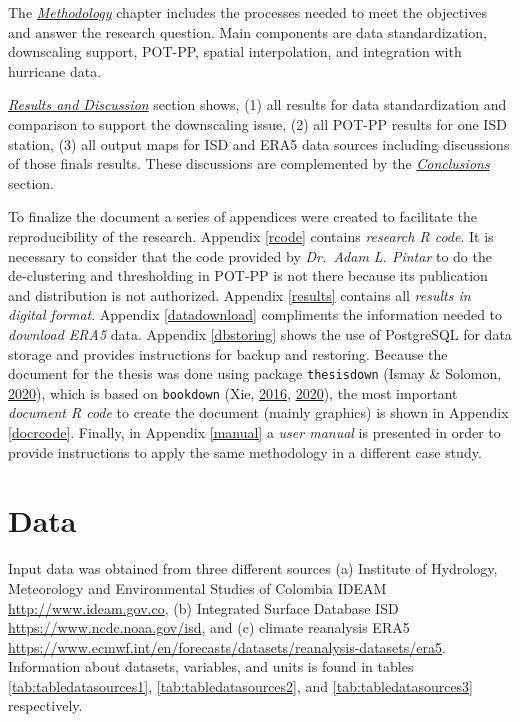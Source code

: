 \documentclass[12pt,oneside]{reedthesis}
\begin{document}
The \emph{\protect\hyperlink{rmd-method}{Methodology}} chapter includes the processes needed to meet the objectives and answer the research question. Main components are data standardization, downscaling support, POT-PP, spatial interpolation, and integration with hurricane data.

\emph{\protect\hyperlink{rmd-results}{Results and Discussion}} section shows, (1) all results for data standardization and comparison to support the downscaling issue, (2) all POT-PP results for one ISD station, (3) all output maps for ISD and ERA5 data sources including discussions of those finals results. These discussions are complemented by the \emph{\protect\hyperlink{conclusions}{Conclusions}} section.

To finalize the document a series of appendices were created to facilitate the reproducibility of the research. Appendix \ref{rcode} contains \emph{research R code}. It is necessary to consider that the code provided by \emph{Dr.~Adam L. Pintar} to do the de-clustering and thresholding in POT-PP is not there because its publication and distribution is not authorized. Appendix \ref{results} contains all \emph{results in digital format}. Appendix \ref{datadownload} compliments the information needed to \emph{download ERA5} data. Appendix \ref{dbstoring} shows the use of PostgreSQL for data storage and provides instructions for backup and restoring. Because the document for the thesis was done using package \texttt{thesisdown} (Ismay \& Solomon, \protect\hyperlink{ref-Ismay2020}{2020}), which is based on \texttt{bookdown} (Xie, \protect\hyperlink{ref-Xie2016}{2016}, \protect\hyperlink{ref-Xie2020}{2020}), the most important \emph{document R code} to create the document (mainly graphics) is shown in Appendix \ref{docrcode}. Finally, in Appendix \ref{manual} a \emph{user manual} is presented in order to provide instructions to apply the same methodology in a different case study.

\hypertarget{rmd-data}{%
\chapter{Data}\label{rmd-data}}

Input data was obtained from three different sources (a) Institute of Hydrology, Meteorology and Environmental Studies of Colombia IDEAM \url{http://www.ideam.gov.co}, (b) Integrated Surface Database ISD \url{https://www.ncdc.noaa.gov/isd}, and (c) climate reanalysis ERA5 \url{https://www.ecmwf.int/en/forecasts/datasets/reanalysis-datasets/era5}. Information about datasets, variables, and units is found in tables \ref{tab:tabledatasources1}, \ref{tab:tabledatasources2}, and \ref{tab:tabledatasources3} respectively.
\end{document}
